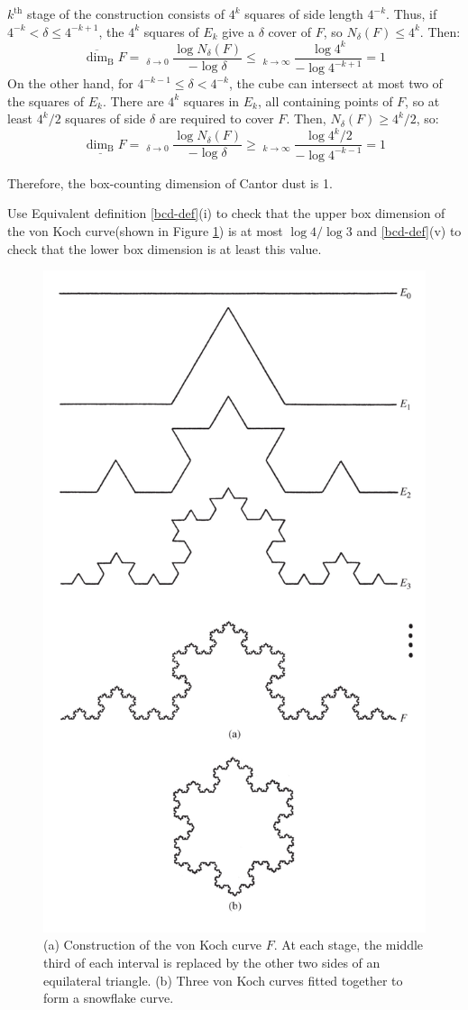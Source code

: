 \documentclass[12pt, a4paper]{article}
\DeclareMathOperator*\lowlim{\underline{lim}}
\DeclareMathOperator*\uplim{\overline{lim}}
\begin{document}
\begin{customsol}{2.4}
    $k^{\text{th}}$ stage of the construction consists of $4^k$ squares of side length $4^{-k}$. Thus, if $4^{-k} < \delta \leq 4^{-k+1}$, the $4^k$ squares of $E_k$ give a $\delta$ cover of $F$, so $N_\delta(F)\leq 4^k$. Then:
    $$
    \overline{\operatorname{dim}}_{\mathrm{B}} F = \uplim_{\delta\rightarrow 0} \frac{\log N_\delta(F)}{-\log \delta}\leq \uplim_{k\rightarrow\infty} \frac{\log 4^k}{-\log 4^{-k+1}} = 1
    $$
    On the other hand, for $4^{-k-1}\leq \delta < 4^{-k}$, the cube can intersect at most two of the squares of $E_k$. There are $4^k$ squares in $E_k$, all containing points of $F$, so at least $4^k/2$ squares of side $\delta$ are required to cover $F$. Then, $N_\delta (F) \geq 4^{k}/2$, so:
    $$
    \underline{\operatorname{dim}_{\mathrm{B}}} F = \lowlim_{\delta\rightarrow 0}\frac{\log N_\delta(F)}{-\log \delta} \geq \lowlim_{k\rightarrow\infty} \frac{\log 4^k/2}{-\log 4^{-k-1}} = 1
    $$

    Therefore, the box-counting dimension of Cantor dust is 1. 
\end{customsol}



\begin{customexercise}{2.5}
    Use Equivalent definition \ref{bcd-def}(i) to check that the upper box dimension of the von Koch curve(shown in Figure \ref{fig:kochcurve}) is at most $\log 4 / \log 3$ and \ref{bcd-def}(v) to check that the lower box dimension is at least this value.
    \begin{figure}[t]
        \centering
        \includegraphics[width=.4\textwidth]{images/Kochcurve.png}
        \caption{(a) Construction of the von Koch curve $F$. At each stage, the middle third of each interval is replaced by the other two sides of an equilateral triangle. (b) Three von Koch curves fitted together to form a snowflake curve.}
        \label{fig:kochcurve}
    \end{figure}
\end{customexercise}
\end{document}
